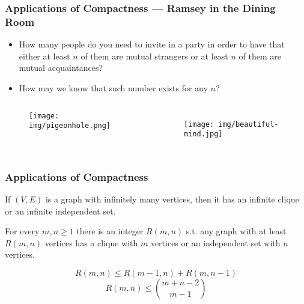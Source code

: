 \documentclass[UTF8,11pt,colorlinks,compress,openany]{beamer}%
\begin{document}
\begin{frame}\frametitle{\small Applications of Compactness --- Ramsey in the Dining Room}
	\begin{problem}
		\begin{itemize}
			\item How many people do you need to invite in a party in order to have that either at least $n$ of them are mutual strangers or at least $n$ of them are mutual acquaintances?
			\item How may we know that such number exists for any $n$?
		\end{itemize}
	\end{problem}
	\begin{columns}
			\begin{center}
				\begin{figure}
					\texttt{[image: img/pigeonhole.png]}
				\end{figure}
			\end{center}
			\begin{center}\vspace{-7pt}
			\end{center}
		\begin{figure}
		\texttt{[image: img/beautiful-mind.jpg]}
		\end{figure}
	\end{columns}
\end{frame}

\begin{frame}\frametitle{Applications of Compactness}
	\begin{theorem}
		If $(V,E)$ is a graph with infinitely many vertices, then it has an infinite clique or an infinite independent set.
	\end{theorem}
	\begin{theorem}
		For every $m,n\geq 1$ there is an integer $R(m,n)$ s.t. any graph with at least $R(m,n)$ vertices has a clique with $m$ vertices or an independent set with $n$ vertices.
	\end{theorem}
	\vspace{-2ex}
	\[R(m,n)\leq R(m-1,n)+R(m,n-1)\]
	\[R(m,n)\leq \binom{m+n-2}{m-1}\]
\end{frame}
\end{document}
